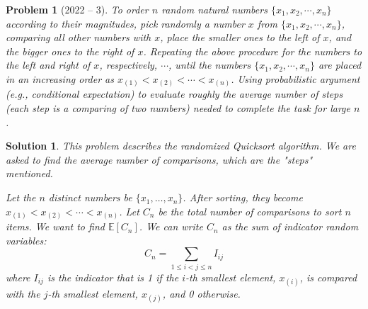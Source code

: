 \documentclass[12pt]{amsart}
\newtheorem{problem}{Problem}
\newtheorem*{solution}{Solution}
\begin{document}
\begin{problem}[2022 -- 3]
To order $n$ random natural numbers $\{x_1, x_2, \cdots, x_n\}$ according to their magnitudes, pick randomly a number $x$ from $\{x_1, x_2, \cdots, x_n\}$, comparing all other numbers with $x$, place the smaller ones to the left of $x$, and the bigger ones to the right of $x$. Repeating the above procedure for the numbers to the left and right of $x$, respectively, $\cdots$, until the numbers $\{x_1, x_2, \cdots, x_n\}$ are placed in an increasing order as $x_{(1)}<x_{(2)}<\cdots<x_{(n)}$. Using probabilistic argument (e.g., conditional expectation) to evaluate roughly the average number of steps (each step is a comparing of two numbers) needed to complete the task for large $n$.
\end{problem}
\begin{solution}
This problem describes the randomized Quicksort algorithm. We are asked to find the average number of comparisons, which are the "steps" mentioned.

Let the $n$ distinct numbers be $\{x_1, \ldots, x_n\}$. After sorting, they become $x_{(1)} < x_{(2)} < \cdots < x_{(n)}$.
Let $C_n$ be the total number of comparisons to sort $n$ items. We want to find $\mathbb{E}[C_n]$.
We can write $C_n$ as the sum of indicator random variables:
$$C_n = \sum_{1 \le i < j \le n} I_{ij}$$
where $I_{ij}$ is the indicator that is 1 if the $i$-th smallest element, $x_{(i)}$, is compared with the $j$-th smallest element, $x_{(j)}$, and 0 otherwise.


\end{solution}
\end{document}
